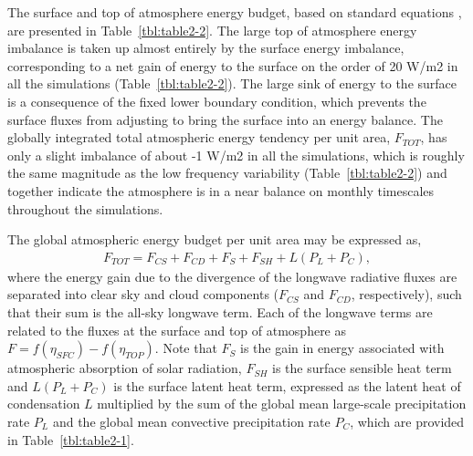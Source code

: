 The surface and top of atmosphere energy budget, based on standard equations \citep{PO1992}, are presented in Table~\ref{tbl:table2-2}. The large top of atmosphere energy imbalance is taken up almost entirely by the surface energy imbalance, corresponding to a net gain of energy to the surface on the order of 20 W/m2 in all the simulations (Table~\ref{tbl:table2-2}). The large sink of energy to the surface is a consequence of the fixed lower boundary condition, which prevents the surface fluxes from adjusting to bring the surface into an energy balance. The globally integrated total atmospheric energy tendency per unit area, $F_{TOT}$, has only a slight imbalance of about -1 W/m2 in all the simulations, which is roughly the same magnitude as the low frequency variability (Table~\ref{tbl:table2-2}) and together indicate the atmosphere is in a near balance on monthly timescales throughout the simulations. 

The global atmospheric energy budget per unit area may be expressed as,
\begin{eqnarray}
F_{TOT} = F_{CS} + F_{CD} + F_{S} + F_{SH} + L(P_L + P_C), \label{eq:eq2-2}
\end{eqnarray}
where the energy gain due to the divergence of the longwave radiative fluxes are separated into clear sky and cloud components ($F_{CS}$ and $F_{CD}$, respectively), such that their sum is the all-sky longwave term. Each of the longwave terms are related to the fluxes at the surface and top of atmosphere as $F = f(\eta_{SFC}) - f(\eta_{TOP})$. Note that $F_{S}$ is the gain in energy associated with atmospheric absorption of solar radiation, $F_{SH}$ is the surface sensible heat term and $L(P_L + P_C)$ is the surface latent heat term, expressed as the latent heat of condensation $L$ multiplied by the sum of the global mean large-scale precipitation rate $P_L$ and the global mean convective precipitation rate $P_C$, which are provided in Table~\ref{tbl:table2-1}.

